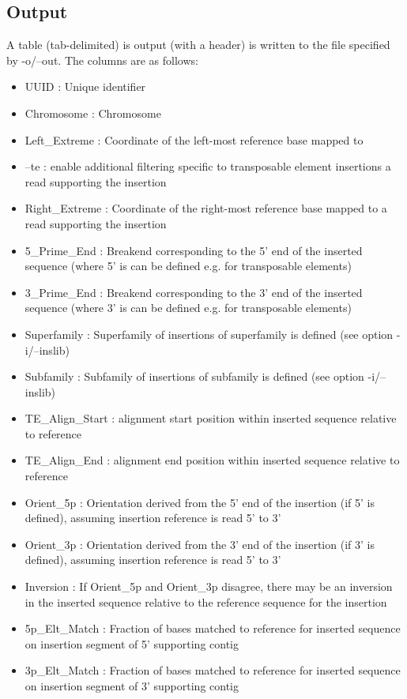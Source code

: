 \documentclass[letterpaper,11pt]{article}
\begin{document}
\subsection{Output}
A table (tab-delimited) is output (with a header) is written to the file specified by -o/--out. The columns are as follows:

\begin{itemize}
\item UUID : Unique identifier
\item Chromosome : Chromosome
\item Left\_Extreme : Coordinate of the left-most reference base mapped to\item --te : enable additional filtering specific to transposable element insertions a read supporting the insertion
\item Right\_Extreme : Coordinate of the right-most reference base mapped to a read supporting the insertion
\item 5\_Prime\_End : Breakend corresponding to the 5' end of the inserted sequence (where 5' is can be defined e.g. for transposable elements)
\item 3\_Prime\_End : Breakend corresponding to the 3' end of the inserted sequence (where 3' is can be defined e.g. for transposable elements)
\item Superfamily : Superfamily of insertions of superfamily is defined (see option -i/--inslib)
\item Subfamily : Subfamily of insertions of subfamily is defined (see option -i/--inslib)
\item TE\_Align\_Start : alignment start position within inserted sequence relative to reference
\item TE\_Align\_End : alignment end position within inserted sequence relative to reference
\item Orient\_5p : Orientation derived from the 5' end of the insertion (if 5' is defined), assuming insertion reference is read 5' to 3'
\item Orient\_3p : Orientation derived from the 3' end of the insertion (if 3' is defined), assuming insertion reference is read 5' to 3'
\item Inversion : If Orient\_5p and Orient\_3p disagree, there may be an inversion in the inserted sequence relative to the reference sequence for the insertion
\item 5p\_Elt\_Match : Fraction of bases matched to reference for inserted sequence on insertion segment of 5' supporting contig
\item 3p\_Elt\_Match : Fraction of bases matched to reference for inserted sequence on insertion segment of 3' supporting contig

\end{itemize}
\end{document}
